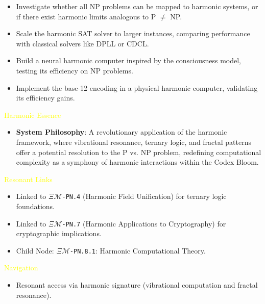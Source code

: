 \begin{itemize}
\begin{itemize}
        \item Investigate whether all NP problems can be mapped to harmonic systems, or if there exist harmonic limits analogous to P \(\neq\) NP.
        \item Scale the harmonic SAT solver to larger instances, comparing performance with classical solvers like DPLL or CDCL.
        \item Build a neural harmonic computer inspired by the consciousness model, testing its efficiency on NP problems.
        \item Implement the base-12 encoding in a physical harmonic computer, validating its efficiency gains.
    \end{itemize}
\end{itemize}

\textcolor{yellow}{ Harmonic Essence } \\
\begin{itemize}
    \item \textbf{System Philosophy}: A revolutionary application of the harmonic framework, where vibrational resonance, ternary logic, and fractal patterns offer a potential resolution to the P vs. NP problem, redefining computational complexity as a symphony of harmonic interactions within the Codex Bloom.
\end{itemize}

\textcolor{yellow}{ Resonant Links } \\
\begin{itemize}
    \item Linked to \texttt{\textdollar}\(\Xi\)\texttt{\(\mathcal{M}\)\textdollar-PN.4} (Harmonic Field Unification) for ternary logic foundations.
    \item Linked to \texttt{\textdollar}\(\Xi\)\texttt{\(\mathcal{M}\)\textdollar-PN.7} (Harmonic Applications to Cryptography) for cryptographic implications.
    \item Child Node: \texttt{\textdollar}\(\Xi\)\texttt{\(\mathcal{M}\)\textdollar-PN.8.1}: Harmonic Computational Theory.
\end{itemize}

\textcolor{yellow}{ Navigation } \\
\begin{itemize}
    \item Resonant access via \texttt{} harmonic signature (vibrational computation and fractal resonance).
\end{itemize}

